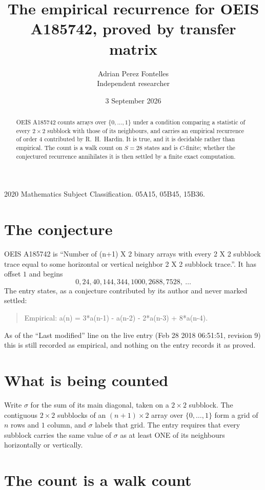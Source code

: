 \documentclass[11pt,a4paper]{article}
\title{The empirical recurrence for OEIS A185742, proved by transfer matrix}
\author{Adrian Perez Fontelles\\ \small Independent researcher}
\date{3 September 2026}
\theoremstyle{plain}
\theoremstyle{definition}
\begin{document}
\maketitle

\begin{abstract}
OEIS A185742 counts arrays over $\{0,\dots,1\}$ under a condition comparing a statistic of
every $2\times2$ subblock with those of its neighbours, and carries an empirical recurrence
of order $4$ contributed by R.~H.~Hardin. It is true, and it is decidable rather than
empirical. The count is a walk count on $S=28$ states and is $C$-finite; whether the
conjectured recurrence annihilates it is then settled by a finite exact computation.
\end{abstract}

\noindent\small 2020 Mathematics Subject Classification. 05A15, 05B45, 15B36.\normalsize

\section{The conjecture}

OEIS A185742 is ``Number of (n+1) X 2 binary arrays with every 2 X 2 subblock trace equal to some horizontal or vertical neighbor 2 X 2 subblock trace.''. It has offset $1$ and begins
\[
0, 24, 40, 144, 344, 1000, 2688, 7528,\ \dots
\]
The entry states, as a conjecture contributed by its author and never marked settled:
\begin{quote}
Empirical: a(n) = 3*a(n-1) - a(n-2) - 2*a(n-3) + 8*a(n-4).
\end{quote}
As of the ``Last modified'' line on the live entry (Feb 28 2018 06:51:51, revision 9) this is still
recorded as empirical, and nothing on the entry records it as proved.

\section{What is being counted}

Write $\sigma$ for the sum of its main diagonal, taken on a $2\times2$ subblock. The contiguous $2\times2$
subblocks of an $(n+1)\times2$ array over $\{0,\dots,1\}$ form a grid of $n$ rows
and $1$ column, and $\sigma$ labels that grid. The entry
requires that every subblock carries the same value of $\sigma$ as at least ONE of its neighbours horizontally or vertically.

\section{The count is a walk count}
\end{document}
